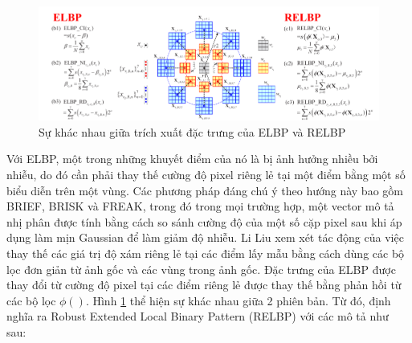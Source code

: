 \begin{figure} [h]
	\centering
	\includegraphics[width= 1\linewidth]{figures/elbpARelbp.png}
	\caption{Sự khác nhau giữa trích xuất đặc trưng của ELBP và RELBP \cite{Liu2016}}
	\label{fig:elbpARelbp}
\end{figure} 
Với ELBP, một trong những khuyết điểm của nó là bị ảnh hưởng nhiều bởi nhiễu, do đó cần phải thay thế cường độ pixel riêng lẻ tại một điểm bằng một số biểu diễn trên một vùng. Các phương pháp đáng chú ý theo hướng này bao gồm BRIEF, BRISK và FREAK, trong đó trong mọi trường hợp, một vector mô tả nhị phân được tính bằng cách so sánh cường độ của một số cặp pixel sau khi áp dụng làm mịn Gaussian để làm giảm độ nhiễu. Li Liu \cite{Liu2016} xem xét tác động của việc thay thế các giá trị độ xám riêng lẻ tại các điểm lấy mẫu bằng cách dùng các bộ lọc đơn giản từ ảnh gốc và các vùng trong ảnh gốc. Đặc trưng của ELBP được thay đổi từ cường độ pixel tại các điểm riêng lẻ được thay thế bằng phản hồi từ các bộ lọc $\phi()$. Hình \ref{fig:elbpARelbp} thể hiện sự khác nhau giữa 2 phiên bản. Từ đó, định nghĩa ra Robust Extended Local Binary Pattern (RELBP) với các mô tả như sau:

